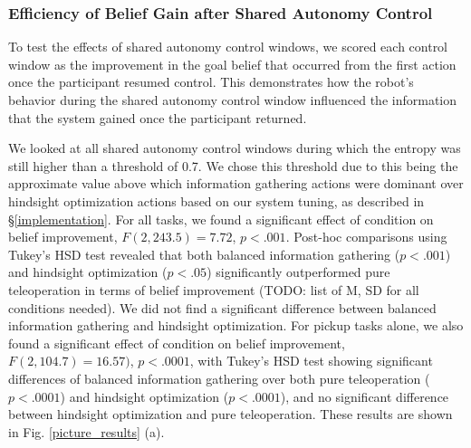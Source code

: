 \documentclass[conference]{IEEEtran}
\begin{document}
\subsubsection{Efficiency of Belief Gain after Shared Autonomy Control}
To test the effects of shared autonomy control windows, we scored each control window as the improvement in the goal belief that occurred from the first action once the participant resumed control. This demonstrates how the robot's behavior during the shared autonomy control window influenced the information that the system gained once the participant returned. 


We looked at all shared autonomy control windows during which the entropy was still higher than a threshold of 0.7. We chose this threshold due to this being the approximate value above which information gathering actions were dominant over hindsight optimization actions based on our system tuning, as described in \S\ref{implementation}. For all tasks, we found a significant effect of condition on belief improvement, $F(2, 243.5) = 7.72$, $p < .001$. Post-hoc comparisons using Tukey's HSD test revealed that both balanced information gathering ($p < .001$) and hindsight optimization ($p < .05$) significantly outperformed pure teleoperation in terms of belief improvement (TODO: list of M, SD for all conditions needed). We did not find a significant difference between balanced information gathering and hindsight optimization. For pickup tasks alone, we also found a significant effect of condition on belief improvement, $F(2, 104.7) = 16.57)$, $p < .0001$, with Tukey's HSD test showing significant differences of balanced information gathering over both pure teleoperation ($p < .0001$) and hindsight optimization ($p < .0001$), and no significant difference between hindsight optimization and pure teleoperation. These results are shown in Fig. \ref{picture_results} (a).
\end{document}
